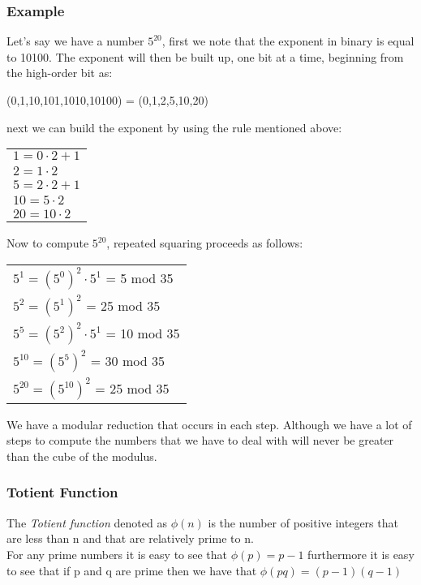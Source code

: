 \documentclass[a4paper]{article}
\begin{document}
\subsubsection{Example}
Let's say we have a number $5^{20}$, first we note that the exponent in binary is equal to 10100. The exponent will then be built up, one bit at a time, beginning from the high-order bit as:
\begin{center}
    (0,1,10,101,1010,10100) = (0,1,2,5,10,20)
\end{center}{}
next we can build the exponent by using the rule mentioned above:
\begin{center}
    \begin{tabular}{l}
    $1 = 0 \cdot 2 + 1$\\
    $2 = 1 \cdot 2$\\
    $5 = 2 \cdot 2 + 1$\\
    $10 = 5 \cdot 2$\\
    $20 = 10 \cdot 2$\\
    \end{tabular}{}
\end{center}{}
Now to compute $5^{20}$, repeated squaring proceeds as follows:
\begin{center}
\begin{tabular}{l}
    $5^1 = (5^0)^2 \cdot 5^1$ = 5 mod 35\\
    $5^2 = (5^1)^2$ = 25 mod 35\\
    $5^5 = (5^2)^2 \cdot 5^1$ = 10 mod 35\\
    $5^{10} = (5^5)^2$ = 30 mod 35\\
    $5^{20} = (5^{10})^2$ = 25 mod 35\\
    \end{tabular}{}
\end{center}{}
We have a modular reduction that occurs in each step. Although we have a lot of steps to compute the numbers that we have to deal with will never be greater than the cube of the modulus.

\subsubsection{Totient Function}
The \textit{Totient function} denoted as $\phi(n)$ is the number of positive integers that are less than n and that are relatively prime to n.\\
For any prime numbers it is easy to see that $\phi(p) = p-1$ furthermore it is easy to see that if p and q are prime then we have that $\phi(pq) = (p-1)(q-1)$
\end{document}
